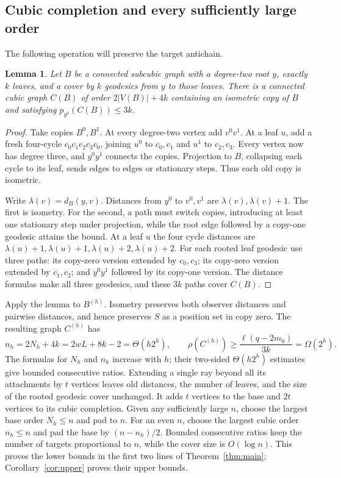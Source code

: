 \documentclass[11pt]{article}
\newtheorem{lemma}[theorem]{Lemma}
\theoremstyle{remark}\newtheorem{remark}[theorem]{Remark}
\begin{document}
\subsection{Cubic completion and every sufficiently large order}
The following operation will preserve the target antichain.
\begin{lemma}\label{lem:cubic}
Let $B$ be a connected subcubic graph with a degree-two root $y$, exactly $k$
leaves, and a cover by $k$ geodesics from $y$ to those leaves. There is a
connected cubic graph $C(B)$ of order $2|V(B)|+4k$ containing an isometric
copy of $B$ and satisfying $p_{y^0}(C(B))\le3k$.
\end{lemma}
\begin{proof}
Take copies $B^0,B^1$. At every degree-two vertex add $v^0v^1$. At a leaf
$u$, add a fresh four-cycle $c_0c_1c_2c_3c_0$, joining $u^0$ to $c_0,c_1$
and $u^1$ to $c_2,c_3$. Every vertex now has degree three, and $y^0y^1$
connects the copies. Projection to $B$, collapsing each cycle to its leaf,
sends edges to edges or stationary steps. Thus each old copy is isometric.

Write $\lambda(v)=d_B(y,v)$. Distances from $y^0$ to $v^0,v^1$ are
$\lambda(v),\lambda(v)+1$. The first is isometry. For the second, a path
must switch copies, introducing at least one stationary step under projection,
while the root edge followed by a copy-one geodesic attains the bound.
At a leaf $u$ the four cycle distances are
$\lambda(u)+1,\lambda(u)+1,\lambda(u)+2,\lambda(u)+2$.
For each rooted leaf geodesic use three paths: its copy-zero version extended
by $c_0,c_3$; its copy-zero version extended by $c_1,c_2$; and $y^0y^1$
followed by its copy-one version. The distance formulas make all three
geodesics, and these $3k$ paths cover $C(B)$.
\end{proof}

Apply the lemma to $B^{(h)}$. Isometry preserves both observer distances
and pairwise distances, and hence preserves $S$ as a position set in copy zero.
The resulting graph $C^{(h)}$ has
\begin{equation}\label{eq:cubicorder}
 n_h=2N_h+4k=2wL+8k-2=\Theta(h2^h),\qquad
 \rho(C^{(h)})\ge\frac{\ell(q-2m_0)}{3k}=\Omega(2^h).
\end{equation}
The formulas for $N_h$ and $n_h$ increase with $h$; their two-sided
$\Theta(h2^h)$ estimates give bounded consecutive ratios. Extending a single ray beyond
all its attachments by $t$ vertices leaves old distances, the number of leaves,
and the size of the rooted geodesic cover unchanged. It adds $t$ vertices
to the base and $2t$ vertices to its cubic completion. Given any sufficiently
large $n$, choose the largest base order $N_h\le n$ and pad to $n$.
For an even $n$, choose the largest cubic order $n_h\le n$ and pad the base
by $(n-n_h)/2$. Bounded consecutive ratios keep the number of targets
proportional to $n$, while the cover size is $O(\log n)$.
This proves the lower bounds in the first two lines of Theorem~\ref{thm:main};
Corollary~\ref{cor:upper} proves their upper bounds.
\end{document}
